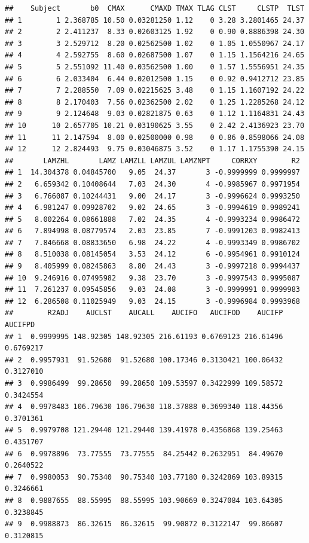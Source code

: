 \documentclass[12pt,]{krantz}
\begin{document}
\begin{verbatim}
##    Subject       b0  CMAX      CMAXD TMAX TLAG CLST     CLSTP  TLST
## 1        1 2.368785 10.50 0.03281250 1.12    0 3.28 3.2801465 24.37
## 2        2 2.411237  8.33 0.02603125 1.92    0 0.90 0.8886398 24.30
## 3        3 2.529712  8.20 0.02562500 1.02    0 1.05 1.0550967 24.17
## 4        4 2.592755  8.60 0.02687500 1.07    0 1.15 1.1564216 24.65
## 5        5 2.551092 11.40 0.03562500 1.00    0 1.57 1.5556951 24.35
## 6        6 2.033404  6.44 0.02012500 1.15    0 0.92 0.9412712 23.85
## 7        7 2.288550  7.09 0.02215625 3.48    0 1.15 1.1607192 24.22
## 8        8 2.170403  7.56 0.02362500 2.02    0 1.25 1.2285268 24.12
## 9        9 2.124648  9.03 0.02821875 0.63    0 1.12 1.1164831 24.43
## 10      10 2.657705 10.21 0.03190625 3.55    0 2.42 2.4136923 23.70
## 11      11 2.147594  8.00 0.02500000 0.98    0 0.86 0.8598066 24.08
## 12      12 2.824493  9.75 0.03046875 3.52    0 1.17 1.1755390 24.15
##       LAMZHL       LAMZ LAMZLL LAMZUL LAMZNPT     CORRXY        R2
## 1  14.304378 0.04845700   9.05  24.37       3 -0.9999999 0.9999997
## 2   6.659342 0.10408644   7.03  24.30       4 -0.9985967 0.9971954
## 3   6.766087 0.10244431   9.00  24.17       3 -0.9996624 0.9993250
## 4   6.981247 0.09928702   9.02  24.65       3 -0.9994619 0.9989241
## 5   8.002264 0.08661888   7.02  24.35       4 -0.9993234 0.9986472
## 6   7.894998 0.08779574   2.03  23.85       7 -0.9991203 0.9982413
## 7   7.846668 0.08833650   6.98  24.22       4 -0.9993349 0.9986702
## 8   8.510038 0.08145054   3.53  24.12       6 -0.9954961 0.9910124
## 9   8.405999 0.08245863   8.80  24.43       3 -0.9997218 0.9994437
## 10  9.246916 0.07495982   9.38  23.70       3 -0.9997543 0.9995087
## 11  7.261237 0.09545856   9.03  24.08       3 -0.9999991 0.9999983
## 12  6.286508 0.11025949   9.03  24.15       3 -0.9996984 0.9993968
##        R2ADJ    AUCLST    AUCALL    AUCIFO   AUCIFOD    AUCIFP   AUCIFPD
## 1  0.9999995 148.92305 148.92305 216.61193 0.6769123 216.61496 0.6769217
## 2  0.9957931  91.52680  91.52680 100.17346 0.3130421 100.06432 0.3127010
## 3  0.9986499  99.28650  99.28650 109.53597 0.3422999 109.58572 0.3424554
## 4  0.9978483 106.79630 106.79630 118.37888 0.3699340 118.44356 0.3701361
## 5  0.9979708 121.29440 121.29440 139.41978 0.4356868 139.25463 0.4351707
## 6  0.9978896  73.77555  73.77555  84.25442 0.2632951  84.49670 0.2640522
## 7  0.9980053  90.75340  90.75340 103.77180 0.3242869 103.89315 0.3246661
## 8  0.9887655  88.55995  88.55995 103.90669 0.3247084 103.64305 0.3238845
## 9  0.9988873  86.32615  86.32615  99.90872 0.3122147  99.86607 0.3120815

\end{verbatim}
\end{document}
